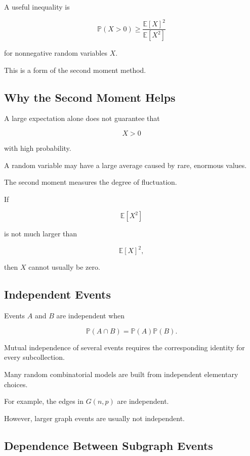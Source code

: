 A useful inequality is

\[
\boxed{
\mathbb{P}(X>0)
\geq
\frac{\mathbb{E}[X]^2}{\mathbb{E}[X^2]}
}
\]

for nonnegative random variables \(X\).

This is a form of the second moment method.

\subsection{Why the Second Moment Helps}
\label{subsec:why-second-moment}

A large expectation alone does not guarantee that

\[
X>0
\]

with high probability.

A random variable may have a large average caused by rare, enormous
values.

The second moment measures the degree of fluctuation.

If

\[
\mathbb{E}[X^2]
\]

is not much larger than

\[
\mathbb{E}[X]^2,
\]

then \(X\) cannot usually be zero.

\subsection{Independent Events}
\label{subsec:independent-events-combinatorics}

Events \(A\) and \(B\) are independent when

\[
\boxed{
\mathbb{P}(A\cap B)
=
\mathbb{P}(A)\mathbb{P}(B).
}
\]

Mutual independence of several events requires the corresponding
identity for every subcollection.

Many random combinatorial models are built from independent elementary
choices.

For example, the edges in \(G(n,p)\) are independent.

However, larger graph events are usually not independent.

\subsection{Dependence Between Subgraph Events}
\label{subsec:subgraph-event-dependence}

